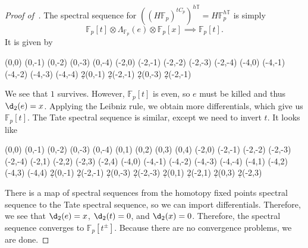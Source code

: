 \documentclass[10pt, oneside]{memoir}
\theoremstyle{definition}
\theoremstyle{remark}
\theoremstyle{plain}
\theoremstyle{definition}
\theoremstyle{remark}
\newcommand{\F}{\mathbb{F}}
\newcommand{\T}{\mathbb{T}}
\newcommand{\1}{\mathbf{1}}
\newcommand{\2}{\mathbf{2}}
\newcommand{\3}{\mathbf{3}}
\begin{document}
\begin{proof}[Proof of~]
    The spectral sequence for $((H\F_p)^{t C_p})^{h\T} = H\F_p^{h\T}$ is simply
    \[ \F_p[t] \otimes \Lambda_{\F_p}(e) \otimes \F_p[x] \implies \F_p[t]. \]
    It is given by
    \begin{center}
        \begin{sseqdata}[classes=fill, class labels={right=0.2em}, name=hfpht, homological Serre
            grading, xscale=1, y axis gap = 2em, axes type = frame] 
            \class["1"](0,0)
            \class["e"](0,-1) 
            \class["t"](0,-2)
            \class["et"](0,-3)
            \class["t^2"](0,-4)
            \class["x"](-2,0) 
            \class(-2,-1) 
            \class(-2,-2) 
            \class(-2,-3) 
            \class(-2,-4) 
            \class["x^2"](-4,0) 
            \class(-4,-1) 
            \class(-4,-2) 
            \class(-4,-3) 
            \class(-4,-4) 
            \d2(0,-1)
            \d2(-2,-1)
            \d2(0,-3)
            \d2(-2,-1)
        \end{sseqdata} 
        \printpage[name=hfpht, page=2]
    \end{center}
    We see that $1$ survives. However, $\F_p[t]$ is even, so $e$ must be killed and thus $\d_2(e) = x$. Applying the Leibniz rule, we obtain more differentials, which give us $\F_p[t]$. The Tate spectral sequence is similar, except we need to invert $t$. It looks like
    \begin{center}
        \begin{sseqdata}[classes=fill, class labels={right=0.2em}, name=tfpht, homological Serre
            grading, xscale=1, y axis gap = 2em, axes type = frame] 
            \class["1"](0,0)
            \class["e"](0,-1) 
            \class["t"](0,-2)
            \class["et"](0,-3)
            \class["t^2"](0,-4)
            \class["et^{-1}"](0,1) 
            \class["t^{-1}"](0,2)
            \class["et^{-2}"](0,3)
            \class["t^{-2}"](0,4)
            \class["x"](-2,0) 
            \class(-2,-1) 
            \class(-2,-2) 
            \class(-2,-3) 
            \class(-2,-4)
            \class(-2,1) 
            \class(-2,2) 
            \class(-2,3) 
            \class(-2,4) 
            \class["x^2"](-4,0) 
            \class(-4,-1) 
            \class(-4,-2) 
            \class(-4,-3) 
            \class(-4,-4) 
            \class(-4,1) 
            \class(-4,2) 
            \class(-4,3) 
            \class(-4,4) 
            \d2(0,-1)
            \d2(-2,-1)
            \d2(0,-3)
            \d2(-2,-3)
            \d2(0,1)
            \d2(-2,1)
            \d2(0,3)
            \d2(-2,3)
        \end{sseqdata} 
        \printpage[name=tfpht, page=2]
    \end{center}
    There is a map of spectral sequences from the homotopy fixed points spectral sequence to the Tate spectral sequence, so we can import differentials. Therefore, we see that $\d_2(e) = x$, $\d_2(t) = 0$, and $\d_2(x) = 0$. Therefore, the spectral sequence converges to $\F_p[t^{\pm}]$. Because there are no convergence problems, we are done.
\end{proof}
\end{document}
